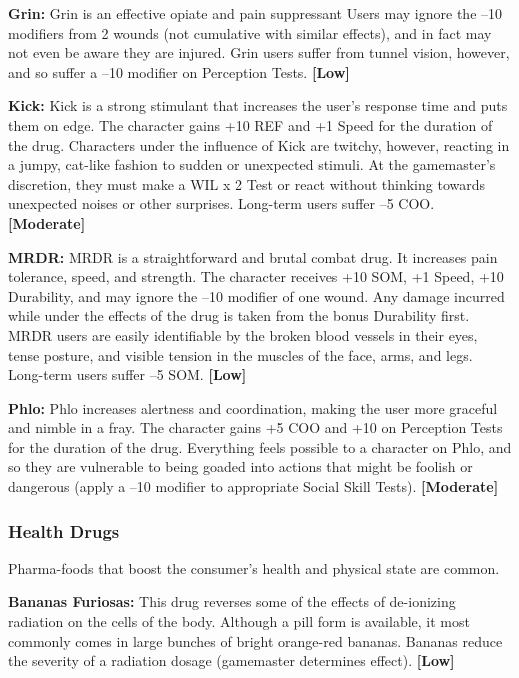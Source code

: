 \textbf{Grin:} Grin is an effective opiate and pain suppressant
Users may ignore the –10 modifiers from
2 wounds (not cumulative with similar effects), and 
in fact may not even be aware they are injured. Grin 
users suffer from tunnel vision, however, and so suffer 
a –10 modifier on Perception Tests. \textbf{[Low]}

\textbf{Kick:} Kick is a strong stimulant that increases the 
user's response time and puts them on edge. The character
gains +10 REF and +1 Speed for the duration of
the drug. Characters under the influence of Kick are 
twitchy, however, reacting in a jumpy, cat-like fashion 
to sudden or unexpected stimuli. At the gamemaster's 
discretion, they must make a WIL x 2 Test or react 
without thinking towards unexpected noises or other 
surprises. Long-term users suffer –5 COO. \textbf{[Moderate]}

\textbf{MRDR:  }MRDR is a straightforward and brutal 
combat drug. It increases pain tolerance, speed, and 
strength. The character receives +10 SOM, +1 Speed, 
+10 Durability, and may ignore the –10 modifier of 
one wound. Any damage incurred while under the 
effects of the drug is taken from the bonus Durability
first. MRDR users are easily identifiable by the
broken blood vessels in their eyes, tense posture, and 
visible tension in the muscles of the face, arms, and 
legs. Long-term users suffer –5 SOM. \textbf{[Low]}

\textbf{Phlo:} Phlo increases alertness and coordination, 
making the user more graceful and nimble in a fray. 
The character gains +5 COO and +10 on Perception 
Tests for the duration of the drug. Everything feels 
possible to a character on Phlo, and so they are vulnerable
to being goaded into actions that might be
foolish or dangerous (apply a –10 modifier to appropriate
Social Skill Tests). \textbf{[Moderate]}

\subsubsection{Health Drugs}

Pharma-foods that boost the consumer's health and 
physical state are common.

\textbf{Bananas Furiosas:} This drug reverses some of the 
effects of de-ionizing radiation on the cells of the 
body. Although a pill form is available, it most commonly
comes in large bunches of bright orange-red
bananas. Bananas reduce the severity of a radiation 
dosage (gamemaster determines effect). \textbf{[Low]}

